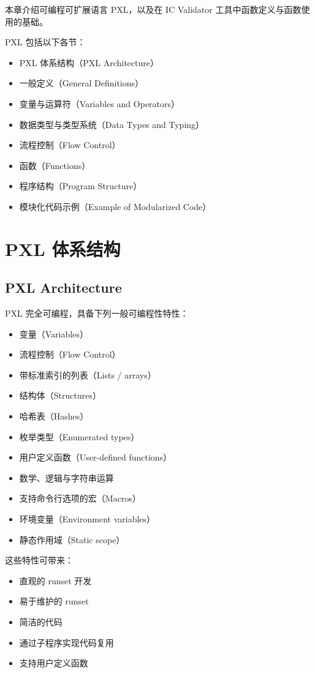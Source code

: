 \label{chap:pxl}

本章介绍可编程可扩展语言 PXL，以及在 IC Validator 工具中函数定义与函数使用的基础。

PXL 包括以下各节：
\begin{itemize}
  \item PXL 体系结构（PXL Architecture）
  \item 一般定义（General Definitions）
  \item 变量与运算符（Variables and Operators）
  \item 数据类型与类型系统（Data Types and Typing）
  \item 流程控制（Flow Control）
  \item 函数（Functions）
  \item 程序结构（Program Structure）
  \item 模块化代码示例（Example of Modularized Code）
\end{itemize}

\section{PXL 体系结构}
\subsection*{PXL Architecture}

PXL 完全可编程，具备下列一般可编程性特性：
\begin{itemize}
  \item 变量（Variables）
  \item 流程控制（Flow Control）
  \item 带标准索引的列表（Lists / arrays）
  \item 结构体（Structures）
  \item 哈希表（Hashes）
  \item 枚举类型（Enumerated types）
  \item 用户定义函数（User-defined functions）
  \item 数学、逻辑与字符串运算
  \item 支持命令行选项的宏（Macros）
  \item 环境变量（Environment variables）
  \item 静态作用域（Static scope）
\end{itemize}

这些特性可带来：
\begin{itemize}
  \item 直观的 runset 开发
  \item 易于维护的 runset
  \item 简洁的代码
  \item 通过子程序实现代码复用
  \item 支持用户定义函数
\end{itemize}

